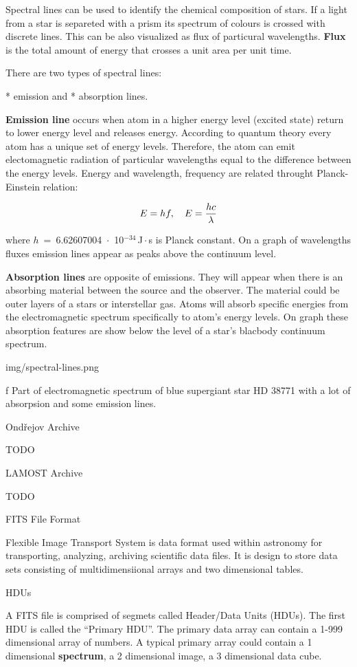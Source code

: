 Spectral lines can be used to identify the chemical
composition of stars. If a light from a star is separeted
with a prism its spectrum of colours is crossed with
discrete lines. This can be also visualized as flux
of particural wavelengths. {\bf Flux} is the total amount of
energy that crosses a unit area per unit time.

There are two types of spectral lines:

\begitems
* emission and
* absorption lines.
\enditems

{\bf Emission line} occurs when atom in a
higher energy level (excited state) return to lower energy
level and releases energy. According to quantum theory
every atom has a unique set of energy levels. Therefore,
the atom can emit electomagnetic radiation of particular
wavelengths equal to the difference between the energy
levels. Energy and wavelength, frequency are related
throught Planck-Einstein relation:

$$ E = h f, \quad E = {h c \over \lambda} $$

where $h$~=~6.62607004~$\cdot$~10$^{-34}$\,J\,$\cdot$\,s is
Planck constant. On a graph of wavelengths fluxes emission
lines appear as peaks above the continuum level.

{\bf Absorption lines} are opposite of emissions. They will
appear when there is an absorbing material between the
source and the observer. The material could be outer layers
of a stars or interstellar gas. Atoms will absorb specific
energies from the electromagnetic spectrum specifically to
atom's energy levels. On graph these absorption
features are show below the level of a star's blacbody
continuum spectrum.

\medskip
\picw=15cm \cinspic img/spectral-lines.png
\caption/f Part of electromagnetic spectrum of blue supergiant star HD
38771 with a lot of absorpsion and some emission lines.
\medskip

\sec Ondřejov Archive

TODO

\sec LAMOST Archive

TODO

\sec FITS File Format

Flexible Image Transport System is data format used within
astronomy for transporting, analyzing, archiving scientific
data files. It is design to store data sets consisting of
multidimensiional arrays and two dimensional tables.

\secc HDUs

A FITS file is comprised of segmets called Header/Data
Units (HDUs). The first HDU is called the ``Primary HDU''.
The primary data array can contain a 1-999 dimensional
array of numbers. A typical primary array could contain
a 1 dimensional {\bf spectrum}, a 2 dimensional image,
a 3 dimensional data cube.

